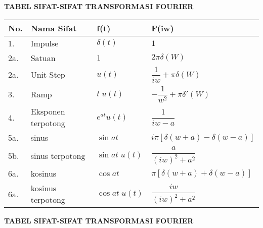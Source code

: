 \documentclass{article}
\begin{document}
\newpage
\begin{center}
    \textbf{TABEL SIFAT-SIFAT TRANSFORMASI FOURIER}
\end{center}

\begin{table}[H]
    \renewcommand{\arraystretch}{2}
    \begin{center}
        \begin{tabular}{|l|l|l|l|}
            \hline
            \textbf{No.} & \textbf{Nama Sifat} & \textbf{f(t)}     & \textbf{F(iw)}                        \\ \hline
            1.           & Impulse             & $\delta(t)$       & $1$                                   \\ \hline
            2a.          & Satuan              & $1$               & $2\pi \delta (W)$                     \\ \hline
            2a.          & Unit Step           & $u(t)$            & $\dfrac{1}{iw}+\pi\delta (W)$         \\ \hline
            3.           & Ramp                & $t\;u(t)$         & $-\dfrac{1}{w^2}+\pi\delta' (W)$      \\ \hline
            4.           & Eksponen terpotong  & $e^{at} u(t)$     & $\dfrac{1}{iw - a}$                   \\ \hline
            5a.          & sinus               & $\sin at$         & $i\pi[\delta(w + a) - \delta(w - a)]$ \\ \hline
            5b.          & sinus terpotong     & $\sin at \; u(t)$ & $\dfrac{a}{(iw)^2 + a^2}$             \\ \hline
            6a.          & kosinus             & $\cos at$         & $\pi[\delta(w + a) + \delta(w - a)]$  \\ \hline
            6a.          & kosinus terpotong   & $\cos at \; u(t)$ & $\dfrac{iw}{(iw)^2 + a^2}$            \\ \hline
        \end{tabular}
    \end{center}
\end{table}



\newpage
\begin{center}
    \textbf{TABEL SIFAT-SIFAT TRANSFORMASI FOURIER}
\end{center}
\end{document}
